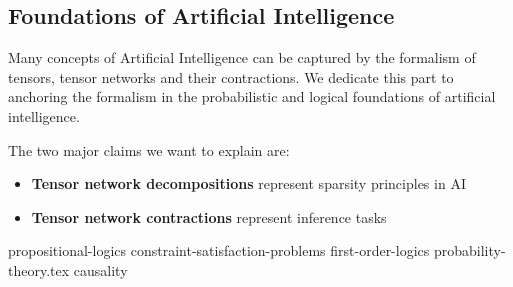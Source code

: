 %
%
%

\begin{partbacktext}
    \part{Foundations of Artificial Intelligence}

    Many concepts of Artificial Intelligence can be captured by the formalism of tensors, tensor networks and their contractions.
    We dedicate this part to anchoring the formalism in the probabilistic and logical foundations of artificial intelligence.

    The two major claims we want to explain are:
    \begin{itemize}
        \item \textbf{Tensor network decompositions} represent sparsity principles in AI
        \item \textbf{Tensor network contractions} represent inference tasks
    \end{itemize}

\end{partbacktext}

{propositional-logics}
{constraint-satisfaction-problems}
{first-order-logics}
{probability-theory.tex}
{causality}
